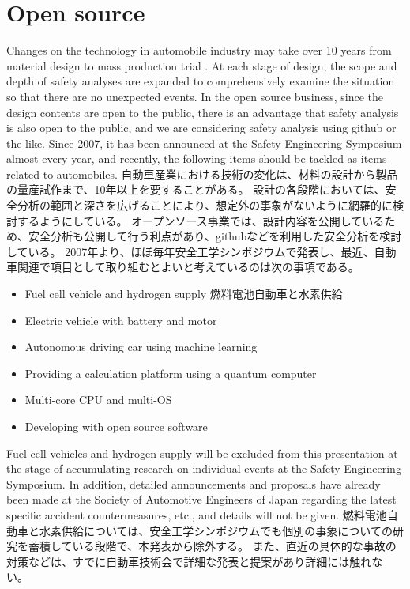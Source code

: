 \documentclass[twocolumn]{article} %
\begin{document}
\section{Open source}
Changes on the technology in automobile industry may take over 10 years from material design to mass production trial .
At each stage of design, the scope and depth of safety analyses are expanded to comprehensively examine the situation so that there are no unexpected events.
In the open source business, since the design contents are open to the public, there is an advantage that safety analysis is also open to the public, and we are considering safety analysis using github or the like.
Since 2007, it has been announced at the Safety Engineering Symposium almost every year, and recently, the following items should be tackled as items related to automobiles.
自動車産業における技術の変化は、材料の設計から製品の量産試作まで、10年以上を要することがある。
設計の各段階においては、安全分析の範囲と深さを広げることにより、想定外の事象がないように網羅的に検討するようにしている。
オープンソース事業では、設計内容を公開しているため、安全分析も公開して行う利点があり、githubなどを利用した安全分析を検討している。
2007年より、ほぼ毎年安全工学シンポジウムで発表し、最近、自動車関連で項目として取り組むとよいと考えているのは次の事項である。
\begin{itemize}
\item Fuel cell vehicle and hydrogen supply 燃料電池自動車と水素供給
\item Electric vehicle with battery and motor 
\item Autonomous driving car using machine learning
\item Providing a calculation platform using a quantum computer
\item Multi-core CPU and multi-OS
\item Developing with open source software
\end{itemize}
Fuel cell vehicles and hydrogen supply will be excluded from this presentation at the stage of accumulating research on individual events at the Safety Engineering Symposium.
In addition, detailed announcements and proposals have already been made at the Society of Automotive Engineers of Japan regarding the latest specific accident countermeasures, etc., and details will not be given.
燃料電池自動車と水素供給については、安全工学シンポジウムでも個別の事象についての研究を蓄積している段階で、本発表から除外する。\cite{anzen2018ando}
また、直近の具体的な事故の対策などは、すでに自動車技術会で詳細な発表と提案があり詳細には触れない\cite{kaminade2020}\cite{konuma2020}。
\end{document}
